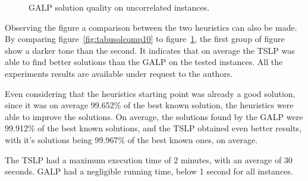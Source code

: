 \figspaces
\begin{figure}[H]
  \begin{center}
  \resizebox{\columnwidth}{!}{%
    \subfloat[1 resource]{} 
    \subfloat[2 resources]{}
    \subfloat[4 resources]{}
  }
  \end{center}
\end{figure}

\figspaces
\begin{figure}[H]
  \begin{center}
  \resizebox{\columnwidth}{!}{%
    \subfloat[1 resource]{} 
    \subfloat[2 resources]{}
    \subfloat[4 resources]{}
  }
  \end{center}
  \caption{GALP solution quality on uncorrelated instances.}
  \label{fig:greedysolcomp10}
\end{figure}

Observing the figure a comparison between the two heuristics can also be made.
By comparing figure~\ref{fig:tabusolcomp10} to 
figure~\ref{fig:greedysolcomp10}, the first group 
of figure show a darker tone than the second. It indicates that on average the TSLP was able to find better
solutions than the GALP on the tested instances. All the experiments results are available under request to the authors.

Even considering that the heuristics starting point was already a good solution, since it was on average
99.652\% of the best known solution, the heuristics were able to improve the solutions. On average, 
the solutions found by the GALP were 99.912\% of the best known solutions, and the TSLP obtained 
even better results, with it's solutions being 99.967\% of the best known ones, on average.

The TSLP had a maximum execution time of 2 minutes, with an average of 30 seconds.
GALP had a negligible running time, below 1 second for all instances.
